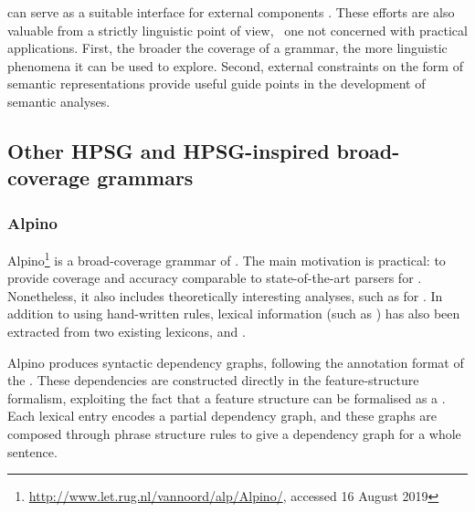 \documentclass[output=paper,nonflat]{langsci/langscibook}
\begin{document}
can serve as a suitable interface for external
components \citep[e.g.,][]{flickinger2005sem}. 
These efforts are also valuable from a strictly linguistic point of view, \ie\ one not concerned with practical applications.
First, the broader the coverage of a grammar,
the more linguistic phenomena it can be used to explore.
Second, external constraints on the form of semantic representations provide
useful guide points in the development of semantic analyses. 


\subsection{Other HPSG and HPSG-inspired broad-coverage grammars}
\label{cl:othergrammars}

\subsubsection{Alpino}
\label{cl:other:alpino}


Alpino\footnote{%
	\url{http://www.let.rug.nl/vannoord/alp/Alpino/}, accessed 16 August 2019
}
is a broad-coverage grammar of 
\citep{BvNM2001a-u,vannoord2005alpino,vannoord2006alpino}.
The main motivation is practical: to provide coverage and accuracy
comparable to state-of-the-art parsers for .
Nonetheless, it also includes theoretically interesting analyses,
such as for  \citep{BvN98a}.
In addition to using hand-written rules,
lexical information (such as ) has also been extracted from two existing lexicons,
 \citep{baayen1995celex}
and  \citep{kruyt1997parole}.

Alpino produces syntactic dependency graphs,
following the annotation format of the  \citep{oostdijk2000corpus}.
These dependencies are constructed directly in the feature-structure formalism,
exploiting the fact that a feature structure can be formalised as a .
Each lexical entry encodes a partial dependency graph,
and these graphs are composed through phrase structure rules
to give a dependency graph for a whole sentence.
\end{document}

